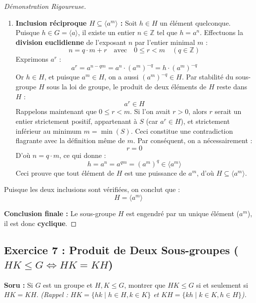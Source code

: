 \documentclass[12pt,a4paper]{report}
\begin{document}
\begin{proof}[Démonstration Rigoureuse]
\begin{itemize}
\begin{enumerate}
        \item \textbf{Inclusion réciproque $H \subseteq \langle a^m \rangle$ :}  
        Soit $h \in H$ un élément quelconque. Puisque $h \in G = \langle a \rangle$, il existe un entier $n \in \mathbb{Z}$ tel que $h = a^n$.  
        Effectuons la \textbf{division euclidienne} de l'exposant $n$ par l'entier minimal $m$ :
        \[ n = q \cdot m + r \quad \text{avec} \quad 0 \leq r < m \quad (q \in \mathbb{Z}) \]
        Exprimons $a^r$ :
        \[ a^r = a^{n - qm} = a^n \cdot (a^m)^{-q} = h \cdot (a^m)^{-q} \]
        Or $h \in H$, et puisque $a^m \in H$, on a aussi $(a^m)^{-q} \in H$.  
        Par stabilité du sous-groupe $H$ sous la loi de groupe, le produit de deux éléments de $H$ reste dans $H$ :
        \[ a^r \in H \]
        Rappelons maintenant que $0 \leq r < m$.  
        Si l'on avait $r > 0$, alors $r$ serait un entier strictement positif, appartenant à $S$ (car $a^r \in H$), et strictement inférieur au minimum $m = \min(S)$.  
        Ceci constitue une contradiction flagrante avec la définition même de $m$.  
        Par conséquent, on a nécessairement :
        \[ r = 0 \]
        D'où $n = q \cdot m$, ce qui donne :
        \[ h = a^n = a^{qm} = (a^m)^q \in \langle a^m \rangle \]
        Ceci prouve que tout élément de $H$ est une puissance de $a^m$, d'où $H \subseteq \langle a^m \rangle$.
    \end{enumerate}
    Puisque les deux inclusions sont vérifiées, on conclut que :
    \[ H = \langle a^m \rangle \]
\end{itemize}
\textbf{Conclusion finale :} Le sous-groupe $H$ est engendré par un unique élément ($a^m$), il est donc \textbf{cyclique}.
\end{proof}

\vspace{0.5cm}

\subsection*{Exercice 7 : Produit de Deux Sous-groupes ($HK \leq G \iff HK = KH$)}
\textbf{Soru :} Si $G$ est un groupe et $H, K \leq G$, montrer que $HK \leq G$ si et seulement si $HK = KH$.  
\textit{(Rappel : $HK = \{ hk \mid h \in H, k \in K \}$ et $KH = \{ kh \mid k \in K, h \in H \}$).}
\end{document}
